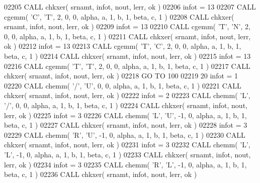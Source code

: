\begin{DoxyCode}
02205       \textcolor{keyword}{CALL }chkxer( srnamt, infot, nout, lerr, ok )
02206       infot = 13
02207       \textcolor{keyword}{CALL }cgemm( \textcolor{stringliteral}{'C'}, \textcolor{stringliteral}{'T'}, 2, 0, 0, alpha, a, 1, b, 1, beta, c, 1 )
02208       \textcolor{keyword}{CALL }chkxer( srnamt, infot, nout, lerr, ok )
02209       infot = 13
02210       \textcolor{keyword}{CALL }cgemm( \textcolor{stringliteral}{'T'}, \textcolor{stringliteral}{'N'}, 2, 0, 0, alpha, a, 1, b, 1, beta, c, 1 )
02211       \textcolor{keyword}{CALL }chkxer( srnamt, infot, nout, lerr, ok )
02212       infot = 13
02213       \textcolor{keyword}{CALL }cgemm( \textcolor{stringliteral}{'T'}, \textcolor{stringliteral}{'C'}, 2, 0, 0, alpha, a, 1, b, 1, beta, c, 1 )
02214       \textcolor{keyword}{CALL }chkxer( srnamt, infot, nout, lerr, ok )
02215       infot = 13
02216       \textcolor{keyword}{CALL }cgemm( \textcolor{stringliteral}{'T'}, \textcolor{stringliteral}{'T'}, 2, 0, 0, alpha, a, 1, b, 1, beta, c, 1 )
02217       \textcolor{keyword}{CALL }chkxer( srnamt, infot, nout, lerr, ok )
02218       \textcolor{keywordflow}{GO TO} 100
02219    20 infot = 1
02220       \textcolor{keyword}{CALL }chemm( \textcolor{stringliteral}{'/'}, \textcolor{stringliteral}{'U'}, 0, 0, alpha, a, 1, b, 1, beta, c, 1 )
02221       \textcolor{keyword}{CALL }chkxer( srnamt, infot, nout, lerr, ok )
02222       infot = 2
02223       \textcolor{keyword}{CALL }chemm( \textcolor{stringliteral}{'L'}, \textcolor{stringliteral}{'/'}, 0, 0, alpha, a, 1, b, 1, beta, c, 1 )
02224       \textcolor{keyword}{CALL }chkxer( srnamt, infot, nout, lerr, ok )
02225       infot = 3
02226       \textcolor{keyword}{CALL }chemm( \textcolor{stringliteral}{'L'}, \textcolor{stringliteral}{'U'}, -1, 0, alpha, a, 1, b, 1, beta, c, 1 )
02227       \textcolor{keyword}{CALL }chkxer( srnamt, infot, nout, lerr, ok )
02228       infot = 3
02229       \textcolor{keyword}{CALL }chemm( \textcolor{stringliteral}{'R'}, \textcolor{stringliteral}{'U'}, -1, 0, alpha, a, 1, b, 1, beta, c, 1 )
02230       \textcolor{keyword}{CALL }chkxer( srnamt, infot, nout, lerr, ok )
02231       infot = 3
02232       \textcolor{keyword}{CALL }chemm( \textcolor{stringliteral}{'L'}, \textcolor{stringliteral}{'L'}, -1, 0, alpha, a, 1, b, 1, beta, c, 1 )
02233       \textcolor{keyword}{CALL }chkxer( srnamt, infot, nout, lerr, ok )
02234       infot = 3
02235       \textcolor{keyword}{CALL }chemm( \textcolor{stringliteral}{'R'}, \textcolor{stringliteral}{'L'}, -1, 0, alpha, a, 1, b, 1, beta, c, 1 )
02236       \textcolor{keyword}{CALL }chkxer( srnamt, infot, nout, lerr, ok )

\end{DoxyCode}
